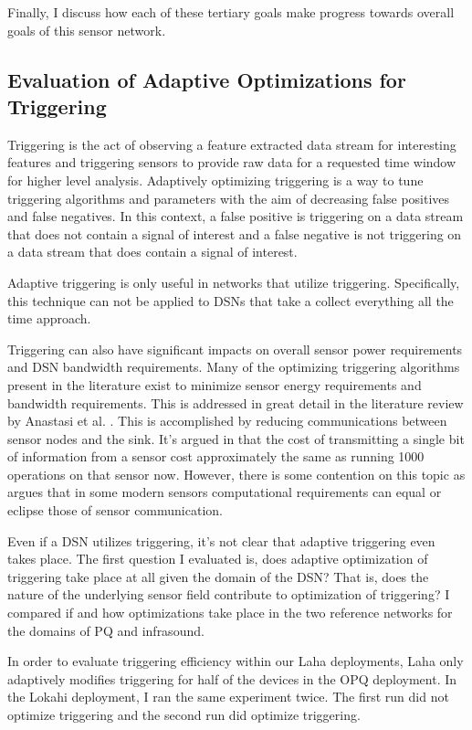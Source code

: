 Finally, I discuss how each of these tertiary goals make progress towards overall goals of this sensor network.

\subsection{Evaluation of Adaptive Optimizations for Triggering}\label{subsec:evaluation-of-adaptive-optimizations-for-triggering}
Triggering is the act of observing a feature extracted data stream for interesting features and triggering sensors to provide raw data for a requested time window for higher level analysis. Adaptively optimizing triggering is a way to tune triggering algorithms and parameters with the aim of decreasing false positives and false negatives. In this context, a false positive is triggering on a data stream that does not contain a signal of interest and a false negative is not triggering on a data stream that does contain a signal of interest.

Adaptive triggering is only useful in networks that utilize triggering. Specifically, this technique can not be applied to DSNs that take a collect everything all the time approach.

Triggering can also have significant impacts on overall sensor power requirements and DSN bandwidth requirements. Many of the optimizing triggering algorithms present in the literature exist to minimize sensor energy requirements and bandwidth requirements. This is addressed in great detail in the literature review by Anastasi et al. \cite{anastasi_energy_2009}. This is accomplished by reducing communications between sensor nodes and the sink. It's argued in \cite{pottie2000wireless} that the cost of transmitting a single bit of information from a sensor cost approximately the same as running 1000 operations on that sensor now. However, there is some contention on this topic as \cite{alippi_adaptive_2010} argues that in some modern sensors computational requirements can equal or eclipse those of  sensor communication.

Even if a DSN utilizes triggering, it's not clear that adaptive triggering even takes place. The first question I evaluated is, does adaptive optimization of triggering take place at all given the domain of the DSN? That is, does the nature of the underlying sensor field contribute to optimization of triggering? I compared if and how optimizations take place in the two reference networks for the domains of PQ and infrasound.

In order to evaluate triggering efficiency within our Laha deployments, Laha only adaptively modifies triggering for half of the devices in the OPQ deployment. In the Lokahi deployment, I  ran the same experiment twice. The first run did not optimize triggering and the second run did optimize triggering.


